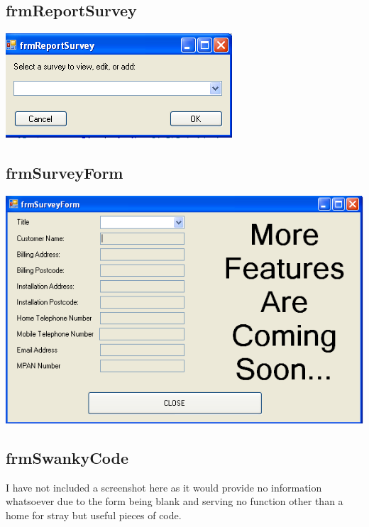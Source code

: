 \subsection{frmReportSurvey}
	\includegraphics[scale=0.5]{frmReportSurvey_scrot}
	
	
\subsection{frmSurveyForm}
	\includegraphics[scale=0.5]{frmSurveyForm_scrot}
	
	
\subsection{frmSwankyCode}
		I have not included a screenshot here as it would provide no information whatsoever due to the form being blank and serving no function other than a home for stray but useful pieces of code.
	
